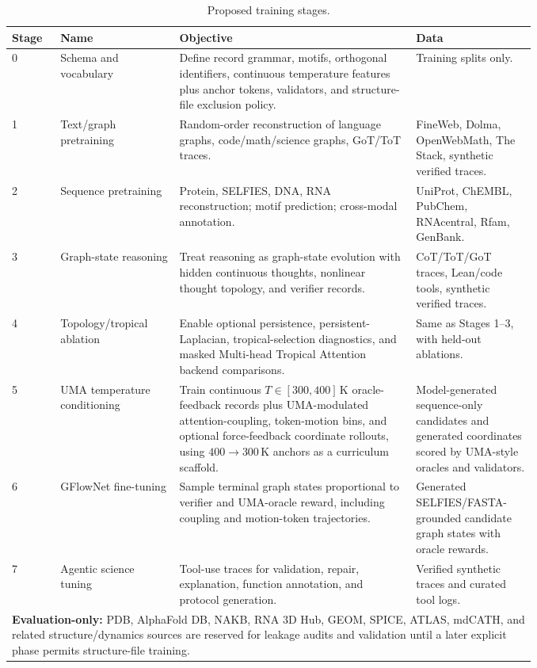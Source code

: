 \documentclass[11pt]{article}
\newcommand{\1}{\mathbf{1}}
\begin{document}
{\scriptsize
\setlength{\tabcolsep}{3pt}
\begin{longtable}{p{0.06\linewidth}p{0.18\linewidth}p{0.37\linewidth}p{0.16\linewidth}}
\caption{Proposed training stages.}\\
\toprule
Stage & Name & Objective & Data \\
\midrule
\endhead
0 & Schema and vocabulary & Define record grammar, motifs, orthogonal identifiers, continuous temperature features plus anchor tokens, validators, and structure-file exclusion policy. & Training splits only. \\
1 & Text/graph pretraining & Random-order reconstruction of language graphs, code/math/science graphs, GoT/ToT traces. & FineWeb, Dolma, OpenWebMath, The Stack, synthetic verified traces. \\
2 & Sequence pretraining & Protein, SELFIES, DNA, RNA reconstruction; motif prediction; cross-modal annotation. & UniProt, ChEMBL, PubChem, RNAcentral, Rfam, GenBank. \\
3 & Graph-state reasoning & Treat reasoning as graph-state evolution with hidden continuous thoughts, nonlinear thought topology, and verifier records. & CoT/ToT/GoT traces, Lean/code tools, synthetic verified traces. \\
4 & Topology/tropical ablation & Enable optional persistence, persistent-Laplacian, tropical-selection diagnostics, and masked Multi-head Tropical Attention backend comparisons. & Same as Stages 1--3, with held-out ablations. \\
5 & UMA temperature conditioning & Train continuous \(T\in[300,400]\,\mathrm K\) oracle-feedback records plus UMA-modulated attention-coupling, token-motion bins, and optional force-feedback coordinate rollouts, using \(400\to300\,\mathrm K\) anchors as a curriculum scaffold. & Model-generated sequence-only candidates and generated coordinates scored by UMA-style oracles and validators. \\
6 & GFlowNet fine-tuning & Sample terminal graph states proportional to verifier and UMA-oracle reward, including coupling and motion-token trajectories. & Generated SELFIES/FASTA-grounded candidate graph states with oracle rewards. \\
7 & Agentic science tuning & Tool-use traces for validation, repair, explanation, function annotation, and protocol generation. & Verified synthetic traces and curated tool logs. \\
\multicolumn{4}{p{0.77\linewidth}}{\textbf{Evaluation-only:} PDB, AlphaFold DB, NAKB, RNA 3D Hub, GEOM, SPICE, ATLAS, mdCATH, and related structure/dynamics sources are reserved for leakage audits and validation until a later explicit phase permits structure-file training.} \\
\bottomrule
\end{longtable}}
\end{document}
